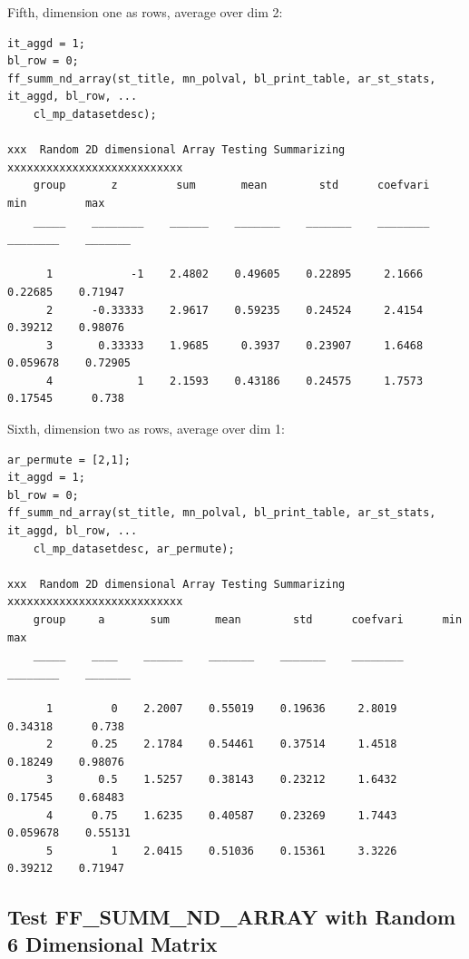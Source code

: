 \documentclass[
]{book}
\begin{document}
Fifth, dimension one as rows, average over dim 2:

\begin{verbatim}
it_aggd = 1; 
bl_row = 0; 
ff_summ_nd_array(st_title, mn_polval, bl_print_table, ar_st_stats, it_aggd, bl_row, ...
    cl_mp_datasetdesc);

xxx  Random 2D dimensional Array Testing Summarizing  xxxxxxxxxxxxxxxxxxxxxxxxxxx
    group       z         sum       mean        std      coefvari      min         max  
    _____    ________    ______    _______    _______    ________    ________    _______

      1            -1    2.4802    0.49605    0.22895     2.1666      0.22685    0.71947
      2      -0.33333    2.9617    0.59235    0.24524     2.4154      0.39212    0.98076
      3       0.33333    1.9685     0.3937    0.23907     1.6468     0.059678    0.72905
      4             1    2.1593    0.43186    0.24575     1.7573      0.17545      0.738
\end{verbatim}

Sixth, dimension two as rows, average over dim 1:

\begin{verbatim}
ar_permute = [2,1];
it_aggd = 1; 
bl_row = 0; 
ff_summ_nd_array(st_title, mn_polval, bl_print_table, ar_st_stats, it_aggd, bl_row, ...
    cl_mp_datasetdesc, ar_permute);

xxx  Random 2D dimensional Array Testing Summarizing  xxxxxxxxxxxxxxxxxxxxxxxxxxx
    group     a       sum       mean        std      coefvari      min         max  
    _____    ____    ______    _______    _______    ________    ________    _______

      1         0    2.2007    0.55019    0.19636     2.8019      0.34318      0.738
      2      0.25    2.1784    0.54461    0.37514     1.4518      0.18249    0.98076
      3       0.5    1.5257    0.38143    0.23212     1.6432      0.17545    0.68483
      4      0.75    1.6235    0.40587    0.23269     1.7443     0.059678    0.55131
      5         1    2.0415    0.51036    0.15361     3.3226      0.39212    0.71947
\end{verbatim}

\hypertarget{test-ff_summ_nd_array-with-random-6-dimensional-matrix}{%
\subsection{Test FF\_SUMM\_ND\_ARRAY with Random 6 Dimensional Matrix}\label{test-ff_summ_nd_array-with-random-6-dimensional-matrix}}
\end{document}
